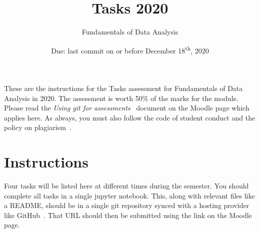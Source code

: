 \documentclass[a4paper, 12pt]{scrartcl}
\title{\vspace{-20mm}Tasks 2020}
\author{Fundamentals of Data Analysis}
\date{Due: last commit on or before December 18\textsuperscript{th}, 2020\vspace{-6mm}}
\begin{document}
  
  \maketitle

  These are the instructions for the Tasks assessment for Fundamentals of Data Analysis in 2020.
  The assessment is worth 50\% of the marks for the module.
  Please read the \emph{Using git for assessments}~\cite{usinggit} document on the Moodle page which applies here.
  As always, you must also follow the code of student conduct and the policy on plagiarism~\cite{gmitqaf}.

  \section*{Instructions}
    Four tasks will be listed here at different times during the semester.
    You should complete all tasks in a single jupyter notebook.
    This, along with relevant files like a README, should be in a single git repository synced with a hosting provider like GitHub~\cite{github}.
    That URL should then be submitted using the link on the Moodle page.
\end{document}
